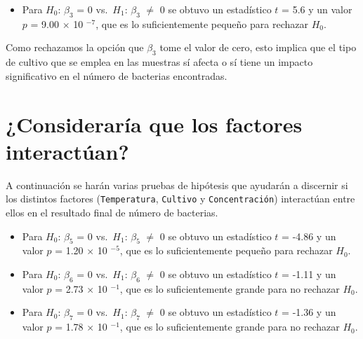 \documentclass[10pt, spanish]{article}
\providecommand{\tightlist}{%
      \setlength{\itemsep}{0pt}\setlength{\parskip}{0pt}}
\begin{document}
    \begin{itemize}
\tightlist
\item
  Para \(H_0\): \(\beta_3\) = 0 vs.~\(H_1\): \(\beta_3\) \(\neq\) 0 se
  obtuvo un estadístico \(t\) = 5.6 y un valor \(p\) = 9.00 \(\times\)
  10 \(^{-7}\), que es lo suficientemente pequeño para rechazar \(H_0\).
\end{itemize}

    
    Como rechazamos la opción que \(\beta_3\) tome el valor de cero, esto
implica que el tipo de cultivo que se emplea en las muestras sí afecta o
sí tiene un impacto significativo en el número de bacterias encontradas.

    \hypertarget{consideraruxeda-que-los-factores-interactuxfaan}{%
\section{¿Consideraría que los factores
interactúan?}\label{consideraruxeda-que-los-factores-interactuxfaan}}

    A continuación se harán varias pruebas de hipótesis que ayudarán a
discernir si los distintos factores (\texttt{Temperatura},
\texttt{Cultivo} y \texttt{Concentración}) interactúan entre ellos en el
resultado final de número de bacterias.

    \begin{itemize}
\tightlist
\item
  Para \(H_0\): \(\beta_5\) = 0 vs.~\(H_1\): \(\beta_5\) \(\neq\) 0 se
  obtuvo un estadístico \(t\) = -4.86 y un valor \(p\) = 1.20 \(\times\)
  10 \(^{-5}\), que es lo suficientemente pequeño para rechazar \(H_0\).
\end{itemize}

    
    \begin{itemize}
\tightlist
\item
  Para \(H_0\): \(\beta_6\) = 0 vs.~\(H_1\): \(\beta_6\) \(\neq\) 0 se
  obtuvo un estadístico \(t\) = -1.11 y un valor \(p\) = 2.73 \(\times\)
  10 \(^{-1}\), que es lo suficientemente grande para no rechazar
  \(H_0\).
\end{itemize}

    
    \begin{itemize}
\tightlist
\item
  Para \(H_0\): \(\beta_7\) = 0 vs.~\(H_1\): \(\beta_7\) \(\neq\) 0 se
  obtuvo un estadístico \(t\) = -1.36 y un valor \(p\) = 1.78 \(\times\)
  10 \(^{-1}\), que es lo suficientemente grande para no rechazar
  \(H_0\).
\end{itemize}
\end{document}
